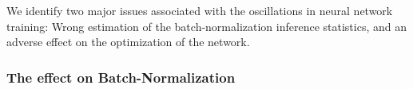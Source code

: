 We identify two major issues associated with the oscillations in neural network training: Wrong estimation of the batch-normalization \citep{batchnorm} inference statistics, and an adverse effect on the optimization of the network.



\subsubsection{The effect on Batch-Normalization}
\label{sec:effect_on_bn_statistics}




